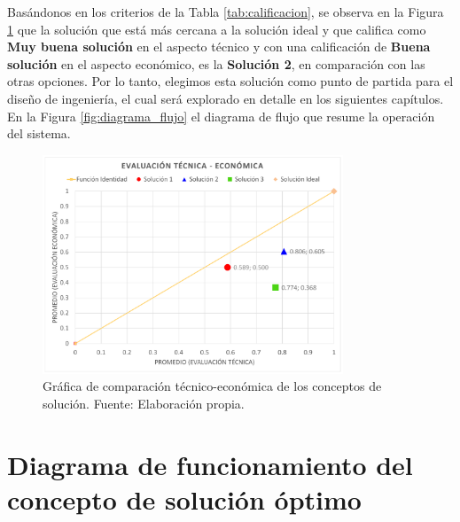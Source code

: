 Basándonos en los criterios de la Tabla \ref{tab:calificacion}, se observa en la Figura \ref{fig:comp_tecnico_economica} que la solución que está más cercana a la solución ideal y que califica como \textbf{Muy buena solución} en el aspecto técnico y con una calificación de \textbf{Buena solución} en el aspecto económico, es la \textbf{Solución 2}, en comparación con las otras opciones. Por lo tanto, elegimos esta solución como punto de partida para el diseño de ingeniería, el cual será explorado en detalle en los siguientes capítulos. En la Figura \ref{fig:diagrama_flujo} el diagrama de flujo que resume la operación del sistema.

\begin{figure}[H]
	\centering
	\includegraphics[width=0.8\textwidth]{img/EVALUACIONES.pdf}
	\caption[Gráfica de comparación técnico-económica de los conceptos de solución.]{Gráfica de comparación técnico-económica de los conceptos de solución. Fuente: Elaboración propia.}
	\label{fig:comp_tecnico_economica}
\end{figure}

\section{Diagrama de funcionamiento del concepto de solución óptimo}


